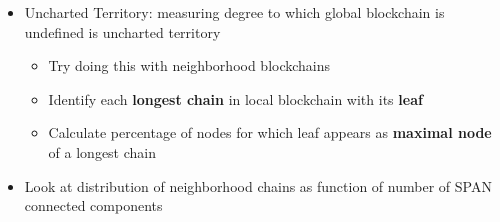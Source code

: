 \documentclass{beamer}
\begin{document}
\begin{frame}
\begin{columns}
		\begin{column}{0.5\textwidth}
			\begin{itemize}
				\item Uncharted Territory: measuring degree to
					which global blockchain is
					undefined is uncharted territory
					\begin{itemize}
						\item Try doing this with neighborhood blockchains
						\item Identify each \textbf{longest chain} in
							local blockchain with its \textbf{leaf}
						\item Calculate percentage of nodes for which leaf
							appears as \textbf{maximal node} of a longest chain
					\end{itemize}
				\item Look at distribution of neighborhood chains
					as function of number of SPAN connected components
			\end{itemize}
		\end{column}
	\end{columns}
\end{frame}
\end{document}
